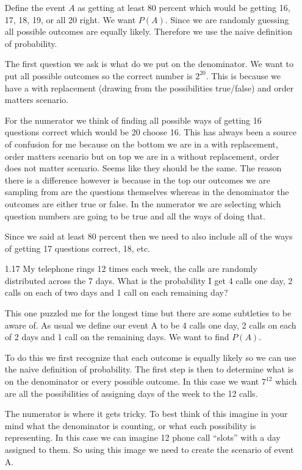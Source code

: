 \begin{enumerate}
Define the event $A$ as getting at least 80 percent which would be getting 16, 17, 18, 19, or all 20 right. We want $P(A)$. Since we are randomly guessing all possible outcomes are equally likely. Therefore we use the naive definition of probability. 

The first question we ask is what do we put on the denominator. We want to put all possible outcomes so the correct number is $2^{20}$. This is because we have a with replacement (drawing from the possibilities true/false) and order matters scenario. 

For the numerator we think of finding all possible ways of getting 16 questions correct which would be 20 choose 16. This has always been a source of confusion for me because on the bottom we are in a with replacement, order matters scenario but on top we are in a without replacement, order does not matter scenario. Seems like they should be the same. The reason there is a difference however is because in the top our outcomes we are sampling from are the questions themselves whereas in the denominator the outcomes are either true or false. In the numerator we are selecting which question numbers are going to be true and all the ways of doing that. 

Since we said at least 80 percent then we need to also include all of the ways of getting 17 questions correct, 18, etc. 
 
\item[1.17]
My telephone rings 12 times each week, the calls are randomly distributed across the 7 days. What is the probability I get 4 calls one day, 2 calls on each of two days and 1 call on each remaining day?

This one puzzled me for the longest time but there are some subtleties to be aware of. As usual we define our event A to be 4 calls one day, 2 calls on each of 2 days and 1 call on the remaining days. We want to find $P(A)$. 

To do this we first recognize that each outcome is equally likely so we can use the naive definition of probability. The first step is then to determine what is on the denominator or every possible outcome. In this case we want $7^{12}$ which are all the possibilities of assigning days of the week to the 12 calls. 

The numerator is where it gets tricky. To best think of this imagine in your mind what the denominator is counting, or what each possibility is representing. In this case we can imagine 12 phone call ``slots'' with a day assigned to them. So using this image we need to create the scenario of event A.


\end{enumerate}
